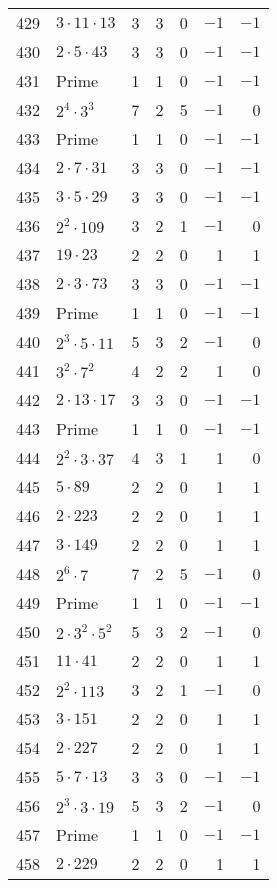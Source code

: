 \documentclass[12pt]{article}
\begin{document}
\begin{tabular}{|r|l|r|r|r|r|r|}
429 & $3 \cdot 11 \cdot 13$ & 3 & 3 & 0 & $-1$ & $-1$ \\
430 & $2 \cdot 5 \cdot 43$ & 3 & 3 & 0 & $-1$ & $-1$ \\
431 & Prime & 1 & 1 & 0 & $-1$ & $-1$ \\
432 & $2^4 \cdot 3^3$ & 7 & 2 & 5 & $-1$ & 0 \\
433 & Prime & 1 & 1 & 0 & $-1$ & $-1$ \\
434 & $2 \cdot 7 \cdot 31$ & 3 & 3 & 0 & $-1$ & $-1$ \\
435 & $3 \cdot 5 \cdot 29$ & 3 & 3 & 0 & $-1$ & $-1$ \\
436 & $2^2 \cdot 109$ & 3 & 2 & 1 & $-1$ & 0 \\
437 & $19 \cdot 23$ & 2 & 2 & 0 & 1 & 1 \\
438 & $2 \cdot 3 \cdot 73$ & 3 & 3 & 0 & $-1$ & $-1$ \\
439 & Prime & 1 & 1 & 0 & $-1$ & $-1$ \\
440 & $2^3 \cdot 5 \cdot 11$ & 5 & 3 & 2 & $-1$ & 0 \\
441 & $3^2 \cdot 7^2$ & 4 & 2 & 2 & 1 & 0 \\
442 & $2 \cdot 13 \cdot 17$ & 3 & 3 & 0 & $-1$ & $-1$ \\
443 & Prime & 1 & 1 & 0 & $-1$ & $-1$ \\
444 & $2^2 \cdot 3 \cdot 37$ & 4 & 3 & 1 & 1 & 0 \\
445 & $5 \cdot 89$ & 2 & 2 & 0 & 1 & 1 \\
446 & $2 \cdot 223$ & 2 & 2 & 0 & 1 & 1 \\
447 & $3 \cdot 149$ & 2 & 2 & 0 & 1 & 1 \\
448 & $2^6 \cdot 7$ & 7 & 2 & 5 & $-1$ & 0 \\
449 & Prime & 1 & 1 & 0 & $-1$ & $-1$ \\
450 & $2 \cdot 3^2 \cdot 5^2$ & 5 & 3 & 2 & $-1$ & 0 \\
451 & $11 \cdot 41$ & 2 & 2 & 0 & 1 & 1 \\
452 & $2^2 \cdot 113$ & 3 & 2 & 1 & $-1$ & 0 \\
453 & $3 \cdot 151$ & 2 & 2 & 0 & 1 & 1 \\
454 & $2 \cdot 227$ & 2 & 2 & 0 & 1 & 1 \\
455 & $5 \cdot 7 \cdot 13$ & 3 & 3 & 0 & $-1$ & $-1$ \\
456 & $2^3 \cdot 3 \cdot 19$ & 5 & 3 & 2 & $-1$ & 0 \\
457 & Prime & 1 & 1 & 0 & $-1$ & $-1$ \\
458 & $2 \cdot 229$ & 2 & 2 & 0 & 1 & 1 \\

\end{tabular}
\end{document}
